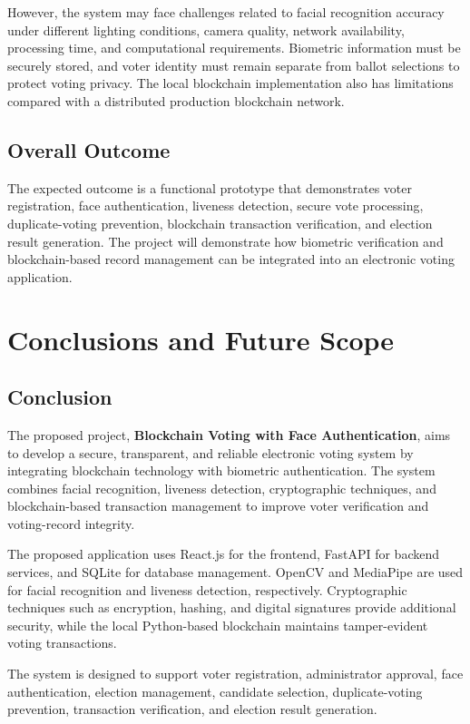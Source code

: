 \documentclass[12pt]{report}
\begin{document}
	However, the system may face challenges related to facial recognition accuracy under different lighting conditions, camera quality, network availability, processing time, and computational requirements. Biometric information must be securely stored, and voter identity must remain separate from ballot selections to protect voting privacy. The local blockchain implementation also has limitations compared with a distributed production blockchain network.
	
	\section{Overall Outcome}
	The expected outcome is a functional prototype that demonstrates voter registration, face authentication, liveness detection, secure vote processing, duplicate-voting prevention, blockchain transaction verification, and election result generation. The project will demonstrate how biometric verification and blockchain-based record management can be integrated into an electronic voting application.

	\chapter{Conclusions and Future Scope}
	
	\section{Conclusion}
	The proposed project, \textbf{Blockchain Voting with Face Authentication}, aims to develop a secure, transparent, and reliable electronic voting system by integrating blockchain technology with biometric authentication. The system combines facial recognition, liveness detection, cryptographic techniques, and blockchain-based transaction management to improve voter verification and voting-record integrity.
	
	The proposed application uses React.js for the frontend, FastAPI for backend services, and SQLite for database management. OpenCV and MediaPipe are used for facial recognition and liveness detection, respectively. Cryptographic techniques such as encryption, hashing, and digital signatures provide additional security, while the local Python-based blockchain maintains tamper-evident voting transactions.
	
	The system is designed to support voter registration, administrator approval, face authentication, election management, candidate selection, duplicate-voting prevention, transaction verification, and election result generation.
	
\end{document}
